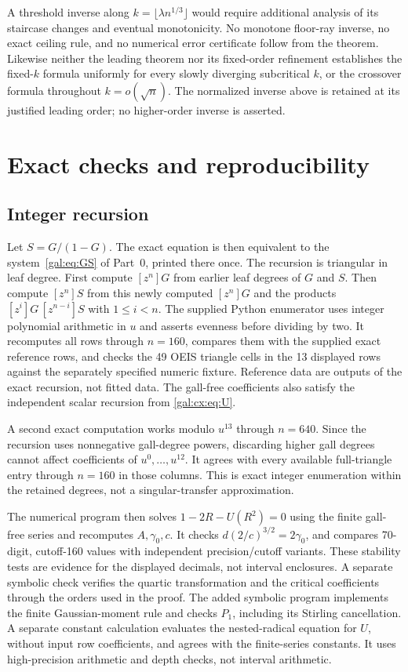 \documentclass[11pt,letterpaper]{article}
\numberwithin{equation}{section}
\theoremstyle{definition}\newtheorem{definition}[theorem]{Definition}
\theoremstyle{remark}\newtheorem{remark}[theorem]{Remark}
\begin{document}
A threshold inverse along $k=\lfloor\lambda n^{1/3}\rfloor$ would require additional analysis of its staircase changes and eventual monotonicity. No monotone floor-ray inverse, no exact ceiling rule, and no numerical error certificate follow from the theorem. Likewise neither the leading theorem nor its fixed-order refinement establishes the fixed-$k$ formula uniformly for every slowly diverging subcritical $k$, or the crossover formula throughout $k=o(\sqrt n)$. The normalized inverse above is retained at its justified leading order; no higher-order inverse is asserted.

\section{Exact checks and reproducibility}\label{gal:cx:sec:checks}
\subsection{Integer recursion}
Let $S=G/(1-G)$. The exact equation is then equivalent to the system~\eqref{gal:eq:GS} of Part~0, printed there once. The recursion is triangular in leaf degree. First compute $[z^n]G$ from earlier leaf degrees of $G$ and $S$. Then compute $[z^n]S$ from this newly computed $[z^n]G$ and the products $[z^i]G\,[z^{n-i}]S$ with $1\le i<n$. The supplied Python enumerator uses integer polynomial arithmetic in $u$ and asserts evenness before dividing by two. It recomputes all rows through $n=160$, compares them with the supplied exact reference rows, and checks the 49 OEIS triangle cells in the 13 displayed rows against the separately specified numeric fixture. Reference data are outputs of the exact recursion, not fitted data. The gall-free coefficients also satisfy the independent scalar recursion from \eqref{gal:cx:eq:U}.

A second exact computation works modulo $u^{13}$ through $n=640$. Since the recursion uses nonnegative gall-degree powers, discarding higher gall degrees cannot affect coefficients of $u^0,\ldots,u^{12}$. It agrees with every available full-triangle entry through $n=160$ in those columns. This is exact integer enumeration within the retained degrees, not a singular-transfer approximation.

The numerical program then solves $1-2R-U(R^2)=0$ using the finite gall-free series and recomputes $A,\gamma_0,c$. It checks $d(2/c)^{3/2}=2\gamma_0$, and compares 70-digit, cutoff-160 values with independent precision/cutoff variants. These stability tests are evidence for the displayed decimals, not interval enclosures. A separate symbolic check verifies the quartic transformation and the critical coefficients through the orders used in the proof. The added symbolic program implements the finite Gaussian-moment rule and checks $P_1$, including its Stirling cancellation. A separate constant calculation evaluates the nested-radical equation for $U$, without input row coefficients, and agrees with the finite-series constants. It uses high-precision arithmetic and depth checks, not interval arithmetic.
\end{document}
